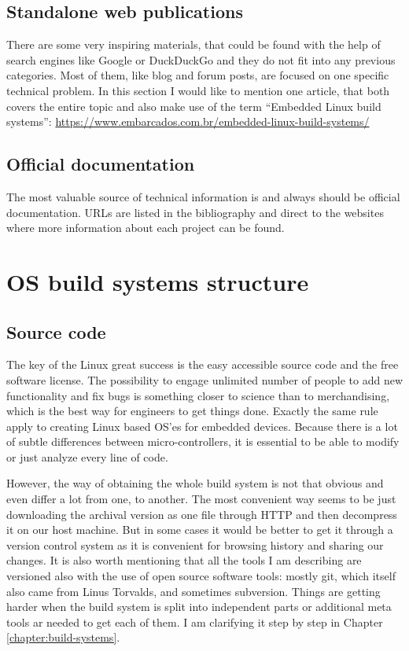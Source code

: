 \documentclass[printmode]{mgr}
\begin{document}
\subsection*{Standalone web publications}

There are some very inspiring materials, that could be found with the help of search engines like Google or DuckDuckGo and they do not fit into any previous categories.
Most of them, like blog and forum posts, are focused on one specific technical problem.
In this section I would like to mention one article, that both covers the entire topic and also make use of the term ``Embedded Linux build systems'': \url{https://www.embarcados.com.br/embedded-linux-build-systems/}

\subsection*{Official documentation}
The most valuable source of technical information is and always should be official documentation. URLs are listed in the bibliography and direct to the websites where more information about each project can be found.



\section{OS build systems structure}
\label{section:builders-structure}

\subsection*{Source code}

The key of the Linux great success is the easy accessible source code and the free software license. The possibility to engage unlimited number of people to add new functionality and fix bugs is something closer to science than to merchandising, which is the best way for engineers to get things done. Exactly the same rule apply to creating Linux based OS'es for embedded devices. Because there is a lot of subtle differences between micro-controllers, it is essential to be able to modify or just analyze every line of code.

However, the way of obtaining the whole build system is not that obvious and even differ a lot from one, to another. The most convenient way seems to be just downloading the archival version as one file through HTTP and then decompress it on our host machine. But in some cases it would be better to get it through a version control system as it is convenient for browsing history and sharing our changes. It is also worth mentioning that all the tools I am describing are versioned also with the use of open source software tools: mostly git, which itself also came from Linus Torvalds, and sometimes subversion. Things are getting harder when the build system is split into independent parts or additional meta tools ar needed to get each of them. I am clarifying it step by step in Chapter \ref{chapter:build-systems}.
\end{document}
